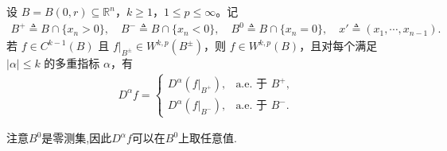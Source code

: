\documentclass[../../main.tex]{subfiles}
\begin{document}
\begin{lemma}[片状函数的弱导数]\label{lemma:ch05-片状Wkp}
设 $B=B(0,r)\subseteq\mathbb{R}^{n}$，$k\geqslant1$，$1\leqslant p\leqslant\infty$。记
\begin{align*}
B^{+}\triangleq B\cap\{x_n>0\},\quad
B^{-}\triangleq B\cap\{x_n<0\},\quad
B^{0}\triangleq B\cap\{x_n=0\},\quad
x'\triangleq(x_1,\cdots,x_{n-1}).
\end{align*}
若 $f\in C^{k-1}(B)$ 且 $f|_{B^{\pm}}\in W^{k,p}(B^{\pm})$，则 $f\in W^{k,p}(B)$，且对每个满足 $|\alpha|\leqslant k$ 的多重指标 $\alpha$，有
\begin{align*}
D^{\alpha}f=
\begin{cases}
D^{\alpha}(f|_{B^{+}}), & \text{a.e. 于 }B^{+},\\
D^{\alpha}(f|_{B^{-}}), & \text{a.e. 于 }B^{-}.
\end{cases}
\end{align*}
\end{lemma}
\begin{remark}
注意$B^0$是零测集,因此$D^\alpha f$可以在$B^0$上取任意值.
\end{remark}
\end{document}

